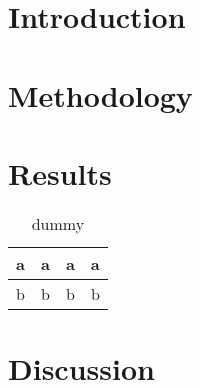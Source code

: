 \documentclass[preprint,authoryear,12pt]{elsarticle}
\begin{document}


\section{Introduction}
\label{sec:introduction}


\section{Methodology}
\label{sec:method}






\section{Results}
\label{sec:results}


\begin{center}
\begin{table}
\label{tab:coruser}
\begin{tabular}{l | c c c}
a & a & a & a \\

\hline
b & b & b & b
\end{tabular}
\caption{dummy}
\end{table}
\end{center}





\section{Discussion}
\label{sec:discussion}
\end{document}
